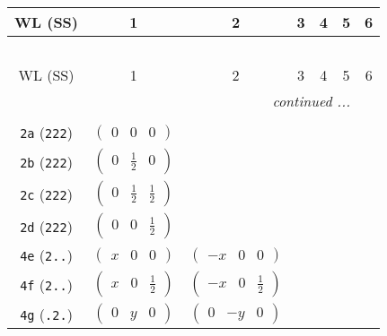 \documentclass[fleqn,9pt,landscape]{jsarticle}
\begin{document}
\begin{center}
\renewcommand{\arraystretch}{1.2}
\begin{longtable}{ccccccc}
 \hline \hline
WL (SS) & 1 & 2 & 3 & 4 & 5 & 6 \\ \hline \endfirsthead

\multicolumn{6}{l}{\tablename\ \thetable{}} \\
 \hline \hline
WL (SS) & 1 & 2 & 3 & 4 & 5 & 6 \\ \hline \endhead

 \hline \hline
\multicolumn{6}{r}{\footnotesize\it continued ...} \\ \endfoot

 \hline \hline
\multicolumn{6}{r}{} \\ \endlastfoot

{\tt 2a} ({\tt 222}) & $ \begin{pmatrix} 0 & 0 & 0 \end{pmatrix} $ & $  $ & $  $ & $  $ \\ \hline
{\tt 2b} ({\tt 222}) & $ \begin{pmatrix} 0 & \frac{1}{2} & 0 \end{pmatrix} $ & $  $ & $  $ & $  $ \\ \hline
{\tt 2c} ({\tt 222}) & $ \begin{pmatrix} 0 & \frac{1}{2} & \frac{1}{2} \end{pmatrix} $ & $  $ & $  $ & $  $ \\ \hline
{\tt 2d} ({\tt 222}) & $ \begin{pmatrix} 0 & 0 & \frac{1}{2} \end{pmatrix} $ & $  $ & $  $ & $  $ \\ \hline
{\tt 4e} ({\tt 2..}) & $ \begin{pmatrix} x & 0 & 0 \end{pmatrix} $ & $ \begin{pmatrix} - x & 0 & 0 \end{pmatrix} $ & $  $ & $  $ \\ \hline
{\tt 4f} ({\tt 2..}) & $ \begin{pmatrix} x & 0 & \frac{1}{2} \end{pmatrix} $ & $ \begin{pmatrix} - x & 0 & \frac{1}{2} \end{pmatrix} $ & $  $ & $  $ \\ \hline
{\tt 4g} ({\tt .2.}) & $ \begin{pmatrix} 0 & y & 0 \end{pmatrix} $ & $ \begin{pmatrix} 0 & - y & 0 \end{pmatrix} $ & $  $ & $  $ \\ \hline

\end{longtable}
\end{center}
\end{document}
